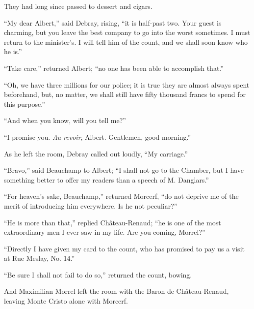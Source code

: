 They had long since passed to dessert and cigars.

“My dear Albert,” said Debray, rising, “it is half-past two. Your guest
is charming, but you leave the best company to go into the worst
sometimes. I must return to the minister’s. I will tell him of the
count, and we shall soon know who he is.”

“Take care,” returned Albert; “no one has been able to accomplish
that.”

“Oh, we have three millions for our police; it is true they are almost
always spent beforehand, but, no matter, we shall still have fifty
thousand francs to spend for this purpose.”

“And when you know, will you tell me?”

“I promise you. \textit{Au revoir}, Albert. Gentlemen, good morning.”

As he left the room, Debray called out loudly, “My carriage.”

“Bravo,” said Beauchamp to Albert; “I shall not go to the Chamber, but
I have something better to offer my readers than a speech of M.
Danglars.”

“For heaven’s sake, Beauchamp,” returned Morcerf, “do not deprive me of
the merit of introducing him everywhere. Is he not peculiar?”

“He is more than that,” replied Château-Renaud; “he is one of the most
extraordinary men I ever saw in my life. Are you coming, Morrel?”

“Directly I have given my card to the count, who has promised to pay us
a visit at Rue Meslay, No. 14.”

“Be sure I shall not fail to do so,” returned the count, bowing.

And Maximilian Morrel left the room with the Baron de Château-Renaud,
leaving Monte Cristo alone with Morcerf.
